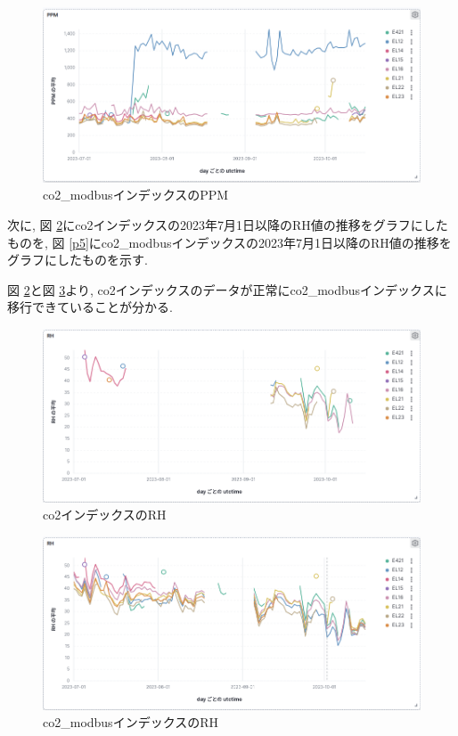 \begin{figure}[!ht]
    \begin{center}
        \includegraphics[width=160mm]{sotu/figure/co2ModbusPPM.png}
        \caption{co2\_modbusインデックスのPPM}
        \label{p21}
    \end{center}
\end{figure}

次に, 図 \ref{p22}にco2インデックスの2023年7月1日以降のRH値の推移をグラフにしたものを, 図 \ref{p5}にco2\_modbusインデックスの2023年7月1日以降のRH値の推移をグラフにしたものを示す.

図 \ref{p22}と図 \ref{p23}より, co2インデックスのデータが正常にco2\_modbusインデックスに移行できていることが分かる.

\begin{figure}[!ht]
    \begin{center}
        \includegraphics[width=160mm]{sotu/figure/co2RH.png}
        \caption{co2インデックスのRH}
        \label{p22}
    \end{center}
\end{figure}

\begin{figure}[!ht]
    \begin{center}
        \includegraphics[width=160mm]{sotu/figure/co2ModbusRH.png}
        \caption{co2\_modbusインデックスのRH}
        \label{p23}
    \end{center}
\end{figure}

